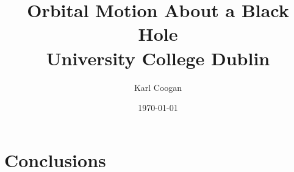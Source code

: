 \documentclass[a4paper,11pt]{article}
\title{Orbital Motion About a Black Hole\\
{\Large University College Dublin}}
\author{Karl Coogan}
\date{\today}
\numberwithin{equation}{section}
\begin{document}


\begin{spacing}{1}
\tableofcontents
\listoffigures
\listoftables
\thispagestyle{empty}
\end{spacing}
\clearpage
{}





\section{Conclusions}

\begin{spacing}{2}

\end{spacing}
\appendix

\end{document}
